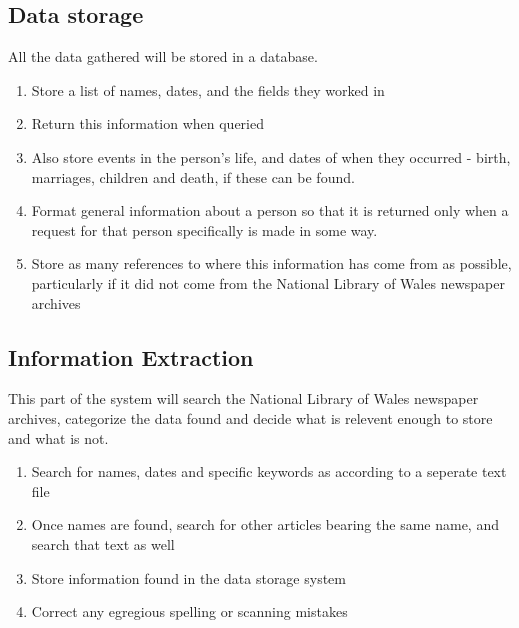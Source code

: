 \documentclass[11pt,a4paper]{article}
\begin{document}
	\subsection{Data storage}
		All the data gathered will be stored in a database.
		\begin{enumerate}
			\item Store a list of names, dates, and the fields they worked in
			\item Return this information when queried
			\item Also store events in the person's life, and dates of when they occurred - birth, marriages, children and death, if these can be found.
			\item Format general information about a person so that it is returned only when a request for that person  specifically is made in some way. 
			\item Store as many references to where this information has come from as possible, particularly if it did not come from the National Library of Wales newspaper archives
		\end{enumerate}
	\subsection{Information Extraction}
		This part of the system will search the National Library of Wales newspaper archives, categorize the data found and decide what is relevent enough to store and what is not. 
		\begin{enumerate}
			\item Search for names, dates and specific keywords as according to a seperate text file
			\item Once names are found, search for other articles bearing the same name, and search that text as well
			\item Store information found in the data storage system
			\item Correct any egregious spelling or scanning mistakes
		\end{enumerate}
\end{document}
